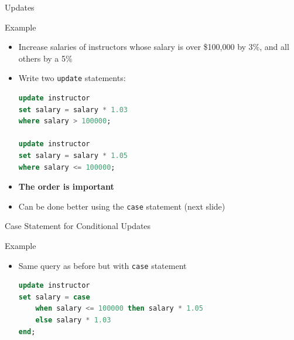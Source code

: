 \documentclass[aspectratio=169, xcolor=dvipsnames]{beamer}
\begin{document}
\begin{frame}[fragile]{Updates}
    \begin{exampleblock}{Example}
        \begin{itemize}[<+->]
            \item Increase salaries of instructors whose salary is over \$100,000 by 3\%, and all others by a 5\%
            \item Write two \texttt{update} statements:
            \begin{lstlisting}[language=SQL]
update instructor 
set salary = salary * 1.03 
where salary > 100000; 

update instructor 
set salary = salary * 1.05 
where salary <= 100000;
            \end{lstlisting}
            \item \textbf{The order is important}
            \item Can be done better using the \texttt{case} statement (next slide)
        \end{itemize}
    \end{exampleblock}
\end{frame}

\begin{frame}[fragile]{Case Statement for Conditional Updates}
    \begin{exampleblock}{Example}
        \begin{itemize}[<+->]
            \item Same query as before but with \texttt{case} statement
            \begin{lstlisting}[language=SQL]
update instructor 
set salary = case
    when salary <= 100000 then salary * 1.05 
    else salary * 1.03
end;
            \end{lstlisting}
        \end{itemize}
    \end{exampleblock}
\end{frame}
\end{document}
